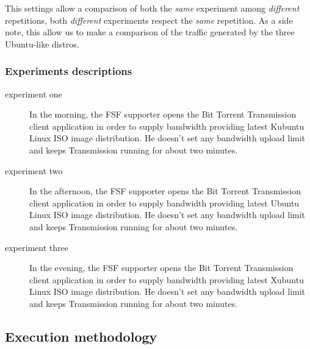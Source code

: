 \documentclass[10pt,a4paper]{article}
\begin{document}
    This settings allow a comparison of both the \emph{same}
    experiment among \emph{different} repetitions, both
    \emph{different} experiments respect the \emph{same} repetition.
    As a side note, this allow us to make a comparison of the traffic
    generated by the three Ubuntu-like distros.

    \subsubsection*{Experiments descriptions}
    
    \begin{description}
    \item[experiment one] In the morning, the FSF supporter opens the
      Bit Torrent Transmission client application in order to supply
      bandwidth providing latest Kubuntu Linux ISO image
      distribution. He doesn't set any bandwidth upload limit and
      keeps Transmission running for about two minutes.
    \item[experiment two] In the afternoon, the FSF supporter opens
      the Bit Torrent Transmission client application in order to
      supply bandwidth providing latest Ubuntu Linux ISO image
      distribution. He doesn't set any bandwidth upload limit and
      keeps Transmission running for about two minutes.
    \item[experiment three] In the evening, the FSF supporter opens
      the Bit Torrent Transmission client application in order to
      supply bandwidth providing latest Xubuntu Linux ISO image
      distribution. He doesn't set any bandwidth upload limit and
      keeps Transmission running for about two minutes.
    \end{description}

    \subsection{Execution methodology}
\end{document}
